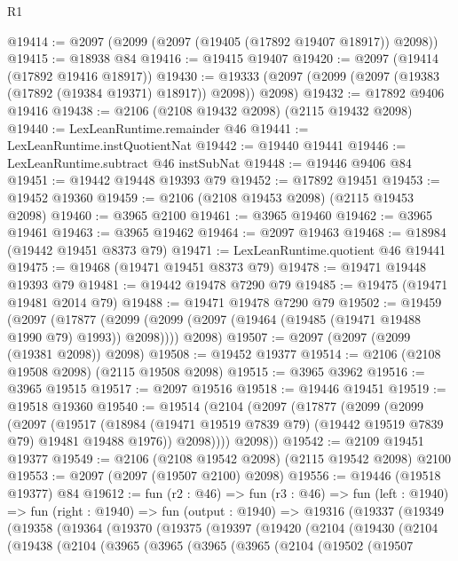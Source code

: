 \begin{lexlean}{R1}
\begin{coremodule}
@19414 := @2097 (@2099 (@2097 (@19405 (@17892 @19407 @18917)) @2098))
@19415 := @18938 @84
@19416 := @19415 @19407
@19420 := @2097 (@19414 (@17892 @19416 @18917))
@19430 := @19333 (@2097 (@2099 (@2097 (@19383 (@17892 (@19384 @19371) @18917)) @2098)) @2098)
@19432 := @17892 @9406 @19416
@19438 := @2106 (@2108 @19432 @2098) (@2115 @19432 @2098)
@19440 := LexLeanRuntime.remainder @46
@19441 := LexLeanRuntime.instQuotientNat
@19442 := @19440 @19441
@19446 := LexLeanRuntime.subtract @46 instSubNat
@19448 := @19446 @9406 @84
@19451 := @19442 @19448 @19393 @79
@19452 := @17892 @19451
@19453 := @19452 @19360
@19459 := @2106 (@2108 @19453 @2098) (@2115 @19453 @2098)
@19460 := @3965 @2100
@19461 := @3965 @19460
@19462 := @3965 @19461
@19463 := @3965 @19462
@19464 := @2097 @19463
@19468 := @18984 (@19442 @19451 @8373 @79)
@19471 := LexLeanRuntime.quotient @46 @19441
@19475 := @19468 (@19471 @19451 @8373 @79)
@19478 := @19471 @19448 @19393 @79
@19481 := @19442 @19478 @7290 @79
@19485 := @19475 (@19471 @19481 @2014 @79)
@19488 := @19471 @19478 @7290 @79
@19502 := @19459
    (@2097
      (@17877 (@2099 (@2099 (@2097 (@19464 (@19485 (@19471 @19488 @1990 @79) @1993)) @2098))))
      @2098)
@19507 := @2097 (@2097 (@2099 (@19381 @2098)) @2098)
@19508 := @19452 @19377
@19514 := @2106 (@2108 @19508 @2098) (@2115 @19508 @2098)
@19515 := @3965 @3962
@19516 := @3965 @19515
@19517 := @2097 @19516
@19518 := @19446 @19451
@19519 := @19518 @19360
@19540 := @19514
    (@2104
      (@2097
        (@17877
          (@2099
            (@2099
              (@2097
                (@19517
                  (@18984 (@19471 @19519 @7839 @79) (@19442 @19519 @7839 @79) @19481 @19488 @1976))
                @2098))))
        @2098))
@19542 := @2109 @19451 @19377
@19549 := @2106 (@2108 @19542 @2098) (@2115 @19542 @2098) @2100
@19553 := @2097 (@2097 (@19507 @2100) @2098)
@19556 := @19446 (@19518 @19377) @84
@19612 := fun (r2 : @46) =>
  fun (r3 : @46) =>
  fun (left : @1940) =>
  fun (right : @1940) =>
  fun (output : @1940) =>
  @19316
    (@19337
      (@19349
        (@19358
          (@19364
            (@19370
              (@19375
                (@19397
                  (@19420
                    (@2104
                      (@19430
                        (@2104
                          (@19438
                            (@2104
                              (@3965
                                (@3965
                                  (@3965
                                    (@3965
                                      (@2104
                                        (@19502
                                          (@19507

\end{coremodule}
\end{lexlean}
